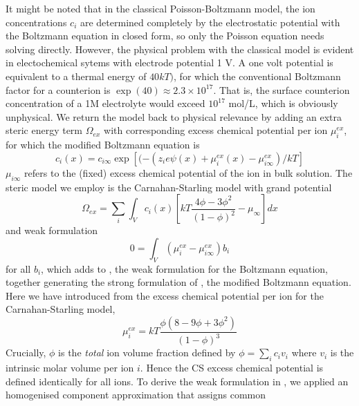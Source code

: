 It might be noted that in the classical Poisson-Boltzmann model, the
ion concentrations $c_i$ are determined completely by the
electrostatic potential with the Boltzmann equation in closed form, so
only the Poisson equation needs solving directly. However, the
physical problem with the classical model is evident in electochemical
sytems with electrode potential 1 V. A one volt potential is
equivalent to a thermal energy of $40 kT)$, for which the conventional
Boltzmann factor for a counterion is
$\exp(40)\approx 2.3 \times 10^{17}$.  That is, the surface counterion
concentration of a 1M electrolyte would exceed $10^{17}$ mol/L, which
is obviously unphysical.  We return the model back to physical
relevance by adding an extra steric energy term $\Omega_{ex}$ with
corresponding excess chemical potential per ion $\mu_{i}^{ex}$, for
which the modified Boltzmann equation is
\begin{equation}
    c_i(x)=c_{i\infty}\exp\left[(-(z_i e \psi(x) + \mu_i^{ex}(x)-\mu_{i\infty}^{ex})/kT\right]
    \label{general_Boltzmann}
\end{equation}
$\mu_{i\infty}$ refers to the (fixed) excess chemical potential of the ion in bulk solution.
The steric model we employ is the Carnahan-Starling model \cite{CarnahanStarling1969} with grand potential
\begin{equation}
    \Omega_{ex} = \sum_{i} \int_{V} c_{i}(x) \left[ kT
    \frac{4\phi - 3\phi^2}{(1-\phi)^2}
    -  \mu_{\infty}
    \right]dx
\end{equation}
and weak formulation
\begin{equation}
    0 = \int_{V} (\mu_i^{ex}-\mu_{i\infty}^{ex}) b_i
    \label{weak_CS}
\end{equation}
for all $b_i$, which adds to , the weak formulation for the Boltzmann equation, together generating the strong formulation of  , the modified Boltzmann equation.
Here we have introduced from the excess chemical potential per ion for the Carnahan-Starling model,
\begin{equation}
    \mu_{i}^{ex} = kT \frac{\phi(8-9\phi+3\phi^2)}{(1-\phi)^3}
    \label{chem_pot_CS}
\end{equation}
Crucially, $\phi$ is the \emph{total} ion volume fraction defined by
$\phi=\sum_i c_i v_i$ where $v_i$ is the intrinsic molar volume per
ion $i$. Hence the CS excess chemical potential is defined identically
for all ions. To derive the weak formulation in , we
applied an homogenised component approximation that assigns common
